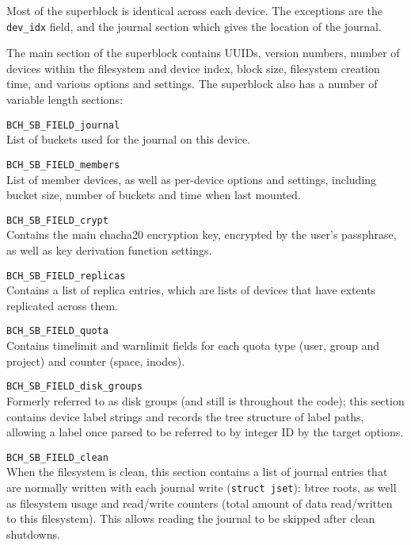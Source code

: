 \documentclass{article}
\begin{document}
Most of the superblock is identical across each device. The exceptions are the
\texttt{dev\_idx} field, and the journal section which gives the location of the
journal.

The main section of the superblock contains UUIDs, version numbers, number of
devices within the filesystem and device index, block size, filesystem creation
time, and various options and settings. The superblock also has a number of
variable length sections:

\begin{description}
	\item \texttt{BCH\_SB\_FIELD\_journal} \\
		List of buckets used for the journal on this device.

	\item \texttt{BCH\_SB\_FIELD\_members} \\
		List of member devices, as well as per-device options and
		settings, including bucket size, number of buckets and time when
		last mounted.

	\item \texttt{BCH\_SB\_FIELD\_crypt} \\
		Contains the main chacha20 encryption key, encrypted by the
		user's passphrase, as well as key derivation function settings.

	\item \texttt{BCH\_SB\_FIELD\_replicas} \\
		Contains a list of replica entries, which are lists of devices
		that have extents replicated across them. 

	\item \texttt{BCH\_SB\_FIELD\_quota} \\
		Contains timelimit and warnlimit fields for each quota type
		(user, group and project) and counter (space, inodes).

	\item \texttt{BCH\_SB\_FIELD\_disk\_groups} \\
		Formerly referred to as disk groups (and still is throughout the
		code); this section contains device label strings and records
		the tree structure of label paths, allowing a label once parsed
		to be referred to by integer ID by the target options.

	\item \texttt{BCH\_SB\_FIELD\_clean} \\
		When the filesystem is clean, this section contains a list of
		journal entries that are normally written with each journal
		write (\texttt{struct jset}): btree roots, as well as filesystem
		usage and read/write counters (total amount of data read/written
		to this filesystem). This allows reading the journal to be
		skipped after clean shutdowns.
\end{description}
\end{document}
